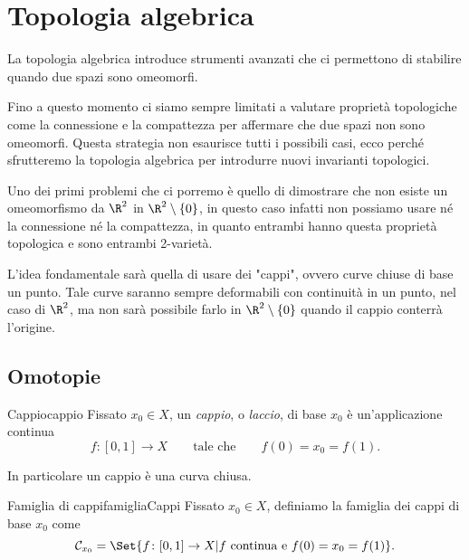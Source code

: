 %
%
\chapter{Topologia algebrica}

La topologia algebrica introduce strumenti avanzati che ci permettono di stabilire quando due spazi sono omeomorfi.

Fino a questo momento ci siamo sempre limitati a valutare proprietà topologiche come la connessione e la compattezza per affermare che due spazi non sono omeomorfi.
Questa strategia non esaurisce tutti i possibili casi, ecco perché sfrutteremo la topologia algebrica per introdurre nuovi invarianti topologici.

Uno dei primi problemi che ci porremo è quello di dimostrare che non esiste un omeomorfismo da \(\R^2\) in \(\R^2\setminus\{0\}\), in questo caso infatti non possiamo usare né la connessione né la compattezza, in quanto entrambi hanno questa proprietà topologica e sono entrambi 2-varietà.

L'idea fondamentale sarà quella di usare dei "cappi", ovvero curve chiuse di base un punto.
Tale curve saranno sempre deformabili con continuità in un punto, nel caso di \(\R^2\), ma non sarà possibile farlo in \(\R^2\setminus\{0\}\) quando il cappio conterrà l'origine.
\section{Omotopie}

\begin{defn}{Cappio}{cappio}
	Fissato \(x_0\in X\), un \emph{cappio}, o \emph{laccio}, di base \(x_0\) è un'applicazione continua
	\[
		f\colon [0,1] \to X \qquad\text{tale che}\qquad f(0)= x_0 = f(1).
	\]
\end{defn}

\begin{oss}
	In particolare un cappio è una curva chiusa.
\end{oss}

\begin{defn}{Famiglia di cappi}{famigliaCappi}
	Fissato \(x_0\in X\), definiamo la famiglia dei cappi di base \(x_0\) come
	\[
		\mathcal{C}_{x_0} = \Set{f\colon [0,1] \to X | f\text{ continua e }f(0)=x_0=f(1)}.
	\]
\end{defn}

